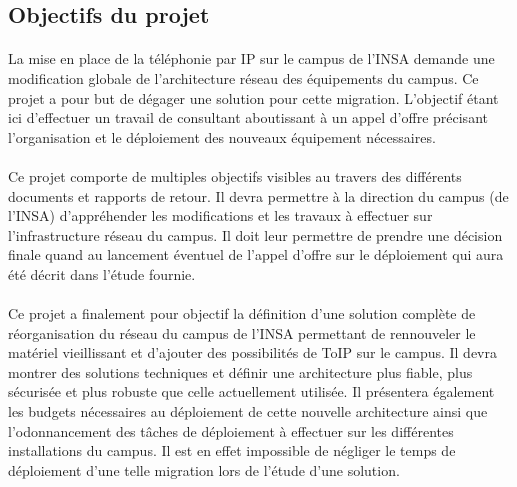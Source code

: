 \subsection{Objectifs du projet}
\paragraph{} La mise en place de la téléphonie par IP sur le campus de l'INSA demande une modification globale de l'architecture réseau des équipements du campus. Ce projet a pour but de dégager une solution pour cette migration. L'objectif étant ici d'effectuer un travail de consultant aboutissant à un appel d'offre précisant l'organisation et le déploiement des nouveaux équipement nécessaires.

\paragraph{} Ce projet comporte de multiples objectifs visibles au travers des différents documents et rapports de retour. Il devra permettre à la direction du campus (de l'INSA) d'appréhender les modifications et les travaux à effectuer sur l'infrastructure réseau du campus. Il doit leur permettre de prendre une décision finale quand au lancement éventuel de l'appel d'offre sur le déploiement qui aura été décrit dans l'étude fournie.

\paragraph{} Ce projet a finalement pour objectif la définition d'une solution complète de réorganisation du réseau du campus de l'INSA permettant de rennouveler le matériel vieillissant et d'ajouter des possibilités de ToIP sur le campus. Il devra montrer des solutions techniques et définir une architecture plus fiable, plus sécurisée et plus robuste que celle actuellement utilisée. Il présentera également les budgets nécessaires au déploiement de cette nouvelle architecture ainsi que l'odonnancement des tâches de déploiement à effectuer sur les différentes installations du campus. Il est en effet impossible de négliger le temps de déploiement d'une telle migration lors de l'étude d'une solution.

